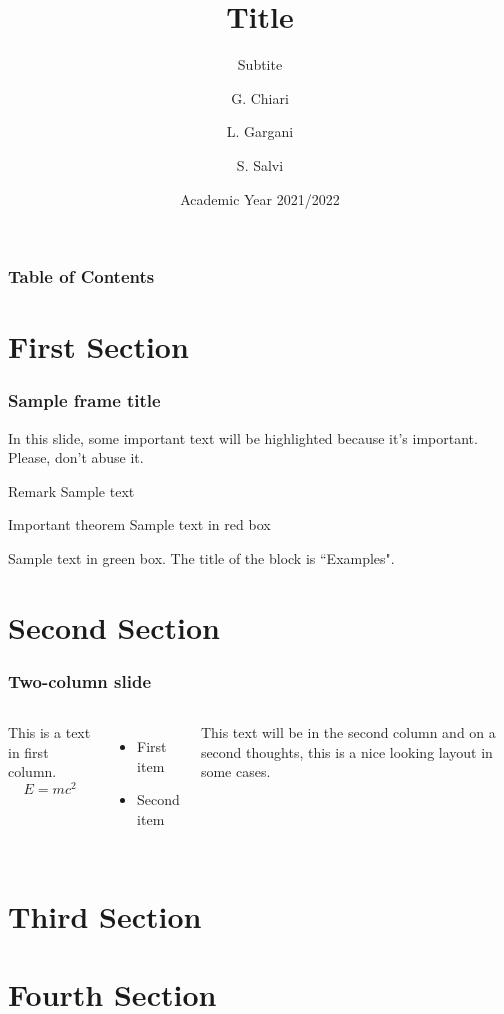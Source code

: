 \documentclass{beamer}
\title{Title}
\subtitle{Subtite}
\author[Chiari, Gargani, Salvi] {G. Chiari \and L. Gargani \and S. Salvi}
\institute {Politecnico di Milano}
\date {Academic Year 2021/2022}
\begin{document}
\begin{frame}
\titlepage
\end{frame}

\begin{frame}
\frametitle{Table of Contents}
\tableofcontents
\end{frame}



\section{First Section}

\begin{frame}
\frametitle{Sample frame title}

In this slide, some important text will be \alert{highlighted} because it's important.
Please, don't abuse it.

\begin{block}{Remark}
Sample text
\end{block}

\begin{alertblock}{Important theorem}
Sample text in red box
\end{alertblock}

\begin{examples}
Sample text in green box. The title of the block is ``Examples".
\end{examples}

\end{frame}


\section{Second Section}

\begin{frame}
\frametitle{Two-column slide}

\begin{columns}

This is a text in first column.
$$E=mc^2$$
\begin{itemize}
	\item First item
	\item Second item
\end{itemize}

This text will be in the second column and on a second thoughts, this is a nice looking layout in some cases.

\end{columns}

\end{frame}


\section{Third Section}
\section{Fourth Section}
\end{document}
